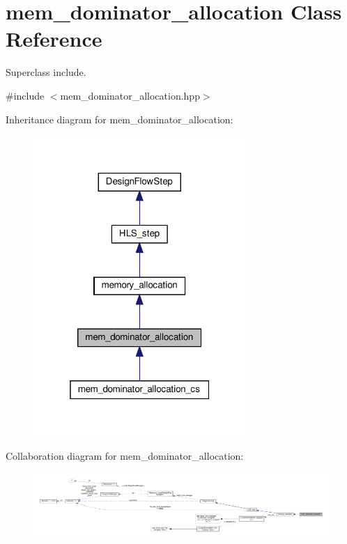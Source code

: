 \hypertarget{classmem__dominator__allocation}{}\section{mem\+\_\+dominator\+\_\+allocation Class Reference}
\label{classmem__dominator__allocation}


Superclass include.  




{\ttfamily \#include $<$mem\+\_\+dominator\+\_\+allocation.\+hpp$>$}



Inheritance diagram for mem\+\_\+dominator\+\_\+allocation\+:
\nopagebreak
\begin{figure}[H]
\begin{center}
\leavevmode
\includegraphics[width=229pt]{d8/d90/classmem__dominator__allocation__inherit__graph}
\end{center}
\end{figure}


Collaboration diagram for mem\+\_\+dominator\+\_\+allocation\+:
\nopagebreak
\begin{figure}[H]
\begin{center}
\leavevmode
\includegraphics[width=350pt]{d2/da5/classmem__dominator__allocation__coll__graph}
\end{center}
\end{figure}
